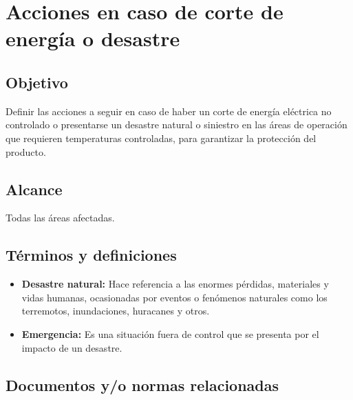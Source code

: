 \renewcommand{\MayorVer}{2}
\renewcommand{\MenorVer}{1}
\renewcommand{\Codigo}{PSA-1-PROG} %
\renewcommand{\FechaPub}{2023--01}
\renewcommand{\Titulo}{Acciones en caso de corte de energía o desastre}

\section{\Titulo}


\subsection{Objetivo}

Definir las acciones a seguir en caso de haber un corte de energía eléctrica no controlado o presentarse un desastre natural o siniestro en las áreas de operación que requieren temperaturas controladas, para garantizar la protección del producto.

\subsection{Alcance}

Todas las áreas afectadas.

\subsection{Términos y definiciones}

\begin{itemize}
	\item \textbf{Desastre natural:} Hace referencia a las enormes pérdidas, materiales y vidas humanas, ocasionadas por eventos o fenómenos naturales como los terremotos, inundaciones, huracanes y otros.
	\item \textbf{Emergencia:} Es una situación fuera de control que se presenta por el impacto de un desastre.
\end{itemize}

\subsection{Documentos y/o normas relacionadas}

